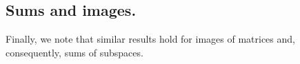 \documentclass{sig-alternate}
\begin{document}
{\subsection*{Sums and images.}

Finally, we note that similar results hold for images of matrices and,
consequently, sums of subspaces.

}

%
%
\end{document}
